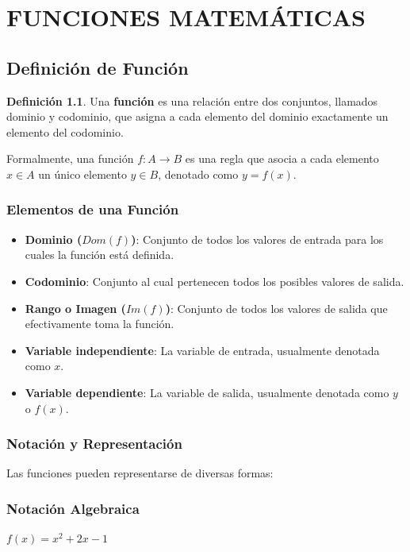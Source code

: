 \documentclass[12pt, a4paper, oneside]{book}
\theoremstyle{definition}
\newtheorem{definicion}{Definición}[chapter]
\begin{document}
\chapter{FUNCIONES MATEMÁTICAS}

\section{Definición de Función}

\begin{definicion}
Una \textbf{función} es una relación entre dos conjuntos, llamados dominio y codominio, que asigna a cada elemento del dominio exactamente un elemento del codominio.

Formalmente, una función $f: A \rightarrow B$ es una regla que asocia a cada elemento $x \in A$ un único elemento $y \in B$, denotado como $y = f(x)$.
\end{definicion}

\subsection{Elementos de una Función}

\begin{itemize}
    \item \textbf{Dominio ($Dom(f)$)}: Conjunto de todos los valores de entrada para los cuales la función está definida.
    \item \textbf{Codominio}: Conjunto al cual pertenecen todos los posibles valores de salida.
    \item \textbf{Rango o Imagen ($Im(f)$)}: Conjunto de todos los valores de salida que efectivamente toma la función.
    \item \textbf{Variable independiente}: La variable de entrada, usualmente denotada como $x$.
    \item \textbf{Variable dependiente}: La variable de salida, usualmente denotada como $y$ o $f(x)$.
\end{itemize}

\subsection{Notación y Representación}

Las funciones pueden representarse de diversas formas:

\subsection{Notación Algebraica}
$f(x) = x^2 + 2x - 1$
\end{document}
